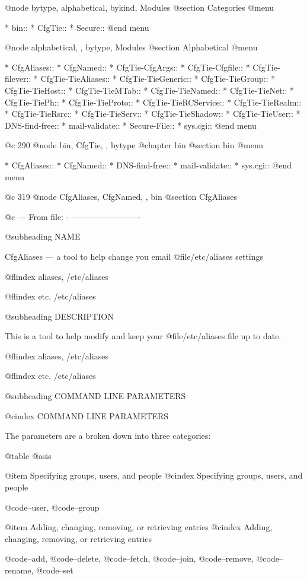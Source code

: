 
@node  bytype,  alphabetical,  bykind, Modules
@section Categories
@menu

* bin::
* CfgTie::
* Secure::
@end menu


@node  alphabetical, ,  bytype, Modules
@section Alphabetical
@menu

* CfgAliases::
* CfgNamed::
* CfgTie-CfgArgs::
* CfgTie-Cfgfile::
* CfgTie-filever::
* CfgTie-TieAliases::
* CfgTie-TieGeneric::
* CfgTie-TieGroup::
* CfgTie-TieHost::
* CfgTie-TieMTab::
* CfgTie-TieNamed::
* CfgTie-TieNet::
* CfgTie-TiePh::
* CfgTie-TieProto::
* CfgTie-TieRCService::
* CfgTie-TieRealm::
* CfgTie-TieRsrc::
* CfgTie-TieServ::
* CfgTie-TieShadow::
* CfgTie-TieUser::
* DNS-find-free::
* mail-validate::
* Secure-File::
* sys.cgi::
@end menu


@c 290
@node bin, CfgTie,  ,  bytype
@chapter bin
@section bin 
@menu

* CfgAliases::
* CfgNamed::
* DNS-find-free::
* mail-validate::
* sys.cgi::
@end menu

@c 319
@node CfgAliases, CfgNamed,  , bin
@section CfgAliases


@c --- From file: - -------------------------

@subheading NAME


CfgAliases --- a tool to help change you email @file{/etc/aliases} settings

@flindex aliases, /etc/aliases

@flindex etc, /etc/aliases

@subheading DESCRIPTION

This is a tool to help modify and keep your @file{/etc/aliases} file up to date.

@flindex aliases, /etc/aliases

@flindex etc, /etc/aliases

@subheading COMMAND LINE PARAMETERS

@cindex COMMAND LINE PARAMETERS

The parameters are a broken down into three categories:

@table @asis

@item Specifying groups, users, and people
@cindex Specifying groups, users, and people

@code{--user}, @code{--group}

@item Adding, changing, removing, or retrieving entries
@cindex Adding, changing, removing, or retrieving entries

@code{--add}, @code{--delete}, @code{--fetch}, @code{--join}, @code{--remove}, @code{--rename},
@code{--set}

